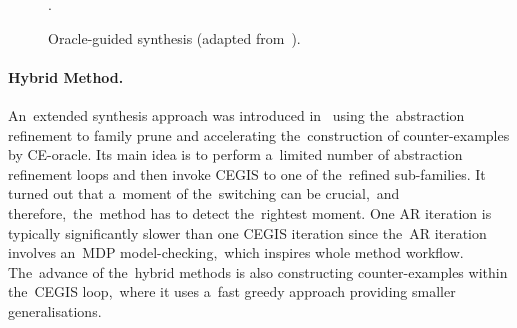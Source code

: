 \begin{figure}[ht!]
    \centering
  \vspace{-0,5em}
    \caption{Oracle-guided synthesis (adapted from~\cite{tacas21}).}
    \label{fig:adaptivesynt}.
    \vspace{-1em}
\end{figure}

\paragraph{Hybrid Method.}
An~extended synthesis approach was introduced in~\cite{roman-DP,tacas21} using the~abstraction refinement to family prune and accelerating the~construction of counter-examples by CE-oracle.
Its main idea is to perform a~limited number of abstraction refinement loops and then invoke CEGIS to one of the~refined sub-families.
It turned out that a~moment of the~switching can be crucial,~and therefore,~the~method has to detect the~rightest moment.
One AR iteration is typically significantly slower than one CEGIS iteration since the~AR iteration involves an~MDP model-checking,~which inspires whole method workflow.
The~advance of the~hybrid methods is also constructing counter-examples within the~CEGIS loop,~where it uses a~fast greedy approach providing smaller generalisations.

